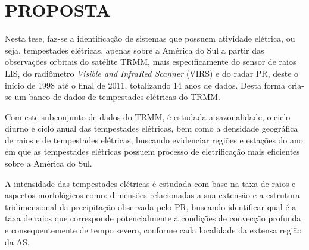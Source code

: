 \section{PROPOSTA}

Nesta tese, faz-se a identificação de sistemas que possuem atividade elétrica, ou seja, tempestades elétricas, apenas sobre a América do Sul  a partir das observações orbitais do satélite TRMM, mais especificamente do sensor de raios LIS, do radiômetro \textit{Visible and InfraRed Scanner} (VIRS) e do radar PR, deste o início de 1998 até o final de 2011, totalizando 14 anos de dados. Desta forma cria-se um banco de dados de tempestades elétricas do TRMM.

Com este subconjunto de dados do TRMM, é estudada a sazonalidade, o ciclo diurno e ciclo anual das tempestades elétricas, bem como a densidade geográfica de raios e de tempestades elétricas, buscando evidenciar regiões e estações do ano em que as tempestades elétricas possuem processo de eletrificação mais eficientes sobre a América do Sul.

A intensidade das tempestades elétricas é estudada com base na taxa de raios e aspectos morfológicos como: dimensões relacionadas a sua extensão e a estrutura tridimensional da precipitação observada pelo PR, buscando identificar qual é a taxa de raios que corresponde potencialmente a condições de convecção profunda e consequentemente de tempo severo, conforme cada localidade da extensa região da AS.

 



